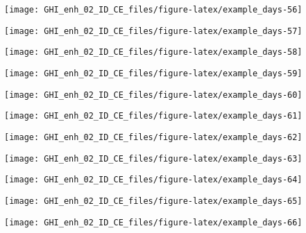 \documentclass[
  10pt,
  a4paper,oneside]{article}
\begin{document}
\begin{center}\texttt{[image: GHI\_enh\_02\_ID\_CE\_files/figure-latex/example\_days-56]} \end{center}

\begin{center}\texttt{[image: GHI\_enh\_02\_ID\_CE\_files/figure-latex/example\_days-57]} \end{center}

\begin{center}\texttt{[image: GHI\_enh\_02\_ID\_CE\_files/figure-latex/example\_days-58]} \end{center}

\begin{center}\texttt{[image: GHI\_enh\_02\_ID\_CE\_files/figure-latex/example\_days-59]} \end{center}

\begin{center}\texttt{[image: GHI\_enh\_02\_ID\_CE\_files/figure-latex/example\_days-60]} \end{center}

\begin{center}\texttt{[image: GHI\_enh\_02\_ID\_CE\_files/figure-latex/example\_days-61]} \end{center}

\begin{center}\texttt{[image: GHI\_enh\_02\_ID\_CE\_files/figure-latex/example\_days-62]} \end{center}

\begin{center}\texttt{[image: GHI\_enh\_02\_ID\_CE\_files/figure-latex/example\_days-63]} \end{center}

\begin{center}\texttt{[image: GHI\_enh\_02\_ID\_CE\_files/figure-latex/example\_days-64]} \end{center}

\begin{center}\texttt{[image: GHI\_enh\_02\_ID\_CE\_files/figure-latex/example\_days-65]} \end{center}

\begin{center}\texttt{[image: GHI\_enh\_02\_ID\_CE\_files/figure-latex/example\_days-66]} \end{center}
\end{document}
